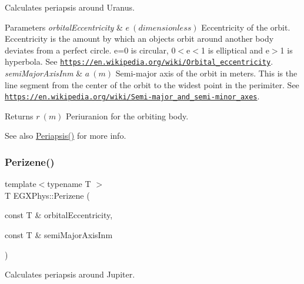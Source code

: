 Calculates periapsis around Uranus. 


\begin{DoxyParams}{Parameters}
{\em orbital\+Eccentricity} & $ e\ (dimensionless)$ Eccentricity of the orbit. Eccentricity is the amount by which an objects orbit around another body deviates from a perfect circle. e=0 is circular, 0$<$e$<$1 is elliptical and e$>$1 is hyperbola. See \href{https://en.wikipedia.org/wiki/Orbital_eccentricity}{\tt https\+://en.\+wikipedia.\+org/wiki/\+Orbital\+\_\+eccentricity}. \\
\hline
{\em semi\+Major\+Axis\+Inm} & $ a\ (m)$ Semi-\/major axis of the orbit in meters. This is the line segment from the center of the orbit to the widest point in the perimiter. See \href{https://en.wikipedia.org/wiki/Semi-major_and_semi-minor_axes}{\tt https\+://en.\+wikipedia.\+org/wiki/\+Semi-\/major\+\_\+and\+\_\+semi-\/minor\+\_\+axes}. \\
\hline
\end{DoxyParams}
\begin{DoxyReturn}{Returns}
$ r\ (m)$ Periuranion for the orbiting body. 
\end{DoxyReturn}
\begin{DoxySeeAlso}{See also}
\mbox{\hyperlink{group___e_g_x_phys-_periapsis_gad487212733711bc2ce73c8137c9309c3}{Periapsis()}} for more info. 
\end{DoxySeeAlso}
\mbox{\label{group___e_g_x_phys-_periapsis_ga8899642f7f872817c611240819b2b968}} 
\subsubsection{\texorpdfstring{Perizene()}{Perizene()}}
{\footnotesize\ttfamily template$<$typename T $>$ \\
T E\+G\+X\+Phys\+::\+Perizene (\begin{DoxyParamCaption}\item[{const T \&}]{orbital\+Eccentricity,  }\item[{const T \&}]{semi\+Major\+Axis\+Inm }\end{DoxyParamCaption})}



Calculates periapsis around Jupiter. 


